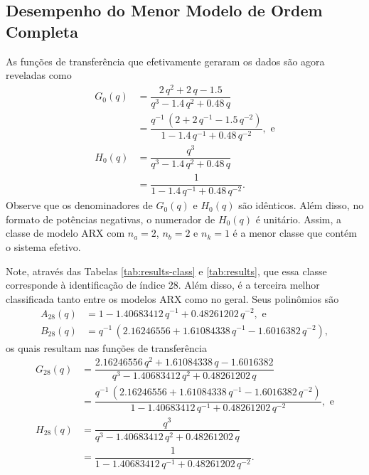 \documentclass{ppgeesa}
\newcommand{\Prod}{\,}
\begin{document}
\subsection{Desempenho do Menor Modelo de Ordem Completa}
As funções de transferência que efetivamente geraram os dados são agora reveladas como
\begin{align}
  G_0(q) &= \dfrac{                   \num{2} \Prod q^2 + \num{2} \Prod q      - \num{1.5}                    }{q^3 - \num{1.4} \Prod q^2    + \num{0.48} \Prod q     }
  \\
         &= \dfrac{q^{-1} \Prod \left(\num{2}           + \num{2} \Prod q^{-1} - \num{1.5} \Prod q^{-2}\right)}{1   - \num{1.4} \Prod q^{-1} + \num{0.48} \Prod q^{-2}}
  , \text{ e}
  \\
  H_0(q) &= \dfrac{q^3}{q^3 - \num{1.4} \Prod q^2    + \num{0.48} \Prod q     }
  \\
         &= \dfrac{1  }{1   - \num{1.4} \Prod q^{-1} + \num{0.48} \Prod q^{-2}}
  .
\end{align}
Observe que os denominadores de $G_0(q)$ e $H_0(q)$ são idênticos.
Além disso, no formato de potências negativas, o numerador de $H_0(q)$ é unitário.
Assim, a classe de modelo ARX com $n_a = 2$, $n_b = 2$ e $n_k = 1$ é a menor classe que contém o sistema efetivo.

Note, através das Tabelas \ref{tab:results-class} e \ref{tab:results}, que essa classe corresponde à identificação de índice 28.
Além disso, é a terceira melhor classificada tanto entre os modelos ARX como no geral.
Seus polinômios são
\begin{align}
  A_{28}(q) &= 1   - \num{1.40683412} \Prod q^{-1} + \num{0.48261202} \Prod q^{-2}
  , \text{ e}
  \\
  B_{28}(q) &= q^{-1} \Prod \left(\num{2.16246556} + \num{1.61084338} \Prod q^{-1} - \num{1.6016382} \Prod q^{-2}\right)
  ,
\end{align}
os quais resultam nas funções de transferência
\begin{align}
  G_{28}(q) &= \dfrac{                   \num{2.16246556} \Prod q^2 + \num{1.61084338} \Prod q      - \num{1.6016382}                    }{q^3 - \num{1.40683412} \Prod q^2    + \num{0.48261202} \Prod q     }
  \\
            &= \dfrac{q^{-1} \Prod \left(\num{2.16246556}           + \num{1.61084338} \Prod q^{-1} - \num{1.6016382} \Prod q^{-2}\right)}{1   - \num{1.40683412} \Prod q^{-1} + \num{0.48261202} \Prod q^{-2}}
  , \text{ e}
  \\
  H_{28}(q) &= \dfrac{q^3}{q^3 - \num{1.40683412} \Prod q^2    + \num{0.48261202} \Prod q     }
  \\
            &= \dfrac{1  }{1   - \num{1.40683412} \Prod q^{-1} + \num{0.48261202} \Prod q^{-2}}
  .
\end{align}
\end{document}
